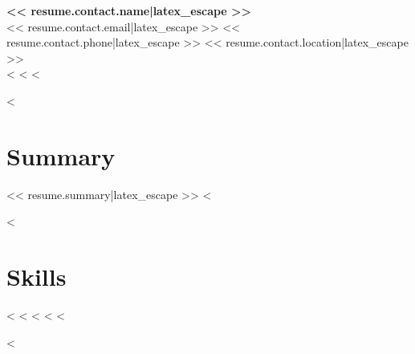 \documentclass[10pt]{article}
\begin{document}
\begin{center}
{\Large \textbf{<< resume.contact.name|latex_escape >>}}\\
<< resume.contact.email|latex_escape >> \quad
<< resume.contact.phone|latex_escape >> \quad
<< resume.contact.location|latex_escape >>\\
<%
<%
<%
\end{center}

<%
\section*{Summary}
<< resume.summary|latex_escape >>
<%

<%
\section*{Skills}
<%
<%
<%
<%
<%

<%
\end{document}

